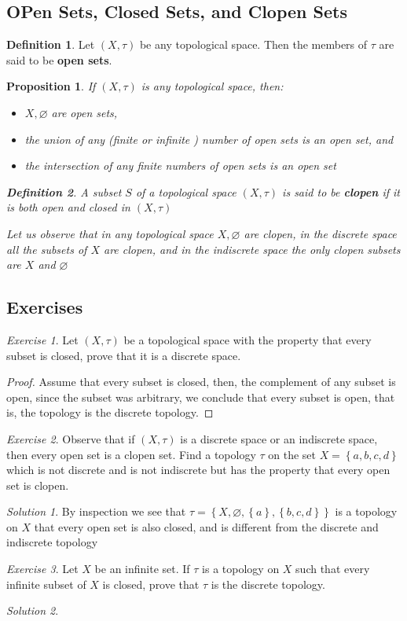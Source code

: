\documentclass[11pt,a4paper,draft]{article}
\newtheorem{prop}{Proposition}[section]
\theoremstyle{definition}
\newtheorem{defn}{Definition}[section]
\theoremstyle{remark}
\newtheorem{exc}{Exercise}
\newtheorem*{sol}{Solution}
\newcommand{\set}[1]{\left\lbrace #1 \right\rbrace}
\begin{document}
\subsection{OPen Sets, Closed Sets, and Clopen Sets}
\begin{defn}
	Let $ (X,\tau) $ be any topological space. Then the members of $ \tau $ are said to be \textbf{open sets}.
\end{defn}
\begin{prop}
	If $ (X,\tau) $ is any topological space, then:
	\begin{itemize}
	\item $ X, \varnothing $ are open sets,
	\item the union of any (finite or infinite ) number of open sets is an open set, and 
	\item the intersection of any finite numbers of open sets is an open set
	\end{itemize}
\begin{defn}
	A subset $ S $ of a topological space $ (X, \tau) $ is said to be \textbf{clopen} if it is both open and closed in $ (X,\tau) $
\end{defn}
Let us observe that in any topological space $ X, \varnothing $ are clopen, in the discrete space all the subsets of $ X $ are clopen, and in the indiscrete space the only clopen subsets are $ X $  and $ \varnothing $
\end{prop}
\subsection{Exercises}
\begin{exc}
	Let $ (X,\tau) $ be a topological space with the property that every subset is closed, prove that it is a discrete space.
\end{exc}
\begin{proof}
	Assume that every subset is closed, then, the complement of any subset is open, since the subset was arbitrary, we conclude that every subset is open, that is, the topology is the discrete topology.
\end{proof}
\begin{exc}
	Observe that if $ (X, \tau) $ is a discrete space or an indiscrete space, then every open set is a clopen set. Find a topology $ \tau $ on the set $ X = \set{a,b,c,d} $ which is not discrete and is not indiscrete but has the property that every open set is clopen.
\end{exc}
\begin{sol}
	By inspection we see that $ \tau = \set{X, \varnothing, \set{a}, \set{b,c,d}} $ is a topology on $ X $ that every open set is also closed, and is different from the discrete and indiscrete topology
\end{sol}
\begin{exc}
	Let $ X $ be an infinite set. If $\tau  $ is a topology on $ X $ such that every infinite subset of $ X $ is closed, prove that $ \tau $ is the discrete topology.
\end{exc}
\begin{sol}
	
\end{sol}
\end{document}
